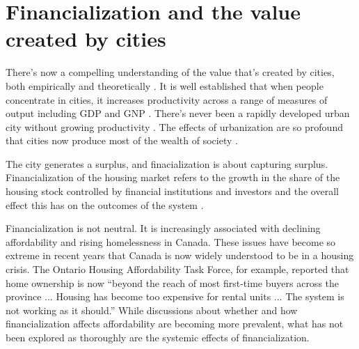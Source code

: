 \section{Financialization and the value created by cities}
There's now a compelling understanding of the value that's created by cities, both empirically and theoretically \cite{jacobsEconomyCities1969, spenceUrbanizationGrowth2009, bettencourtIntroductionUrbanScience2021}. 
 It is well established that when people concentrate in cities, it increases productivity across a range of measures of output including GDP and GNP \cite{bettencourtIntroductionUrbanScience2021}. There's never been a rapidly developed urban city without growing productivity \cite{annezUrbanizationGrowthSetting2009}. The effects of urbanization are so profound that cities now produce most of the wealth of society \cite{GET_cities-most-of-wealth}. 

The city generates a surplus, and finacialization is about capturing surplus. Financialization of the housing market refers to the growth in the share of the housing stock controlled by financial institutions and investors and the overall effect this has on the outcomes of the system \cite{farhaReportFinancializationHousing2017, hansenFinanceCapitalismFinancialization2014}.  

Financialization is not neutral. It is increasingly associated with declining affordability and rising homelessness in Canada. These issues have become so extreme in recent years that Canada is now widely understood to be in a housing crisis. The Ontario Housing Affordability Task Force, for example, reported that home ownership is now ``beyond the reach of most first-time buyers across the province ... Housing has become too expensive for rental units ... The system is not working as it should.'' While discussions about whether and how financialization affects affordability are becoming more prevalent, what has not been explored as thoroughly are the systemic effects of financialization. %

